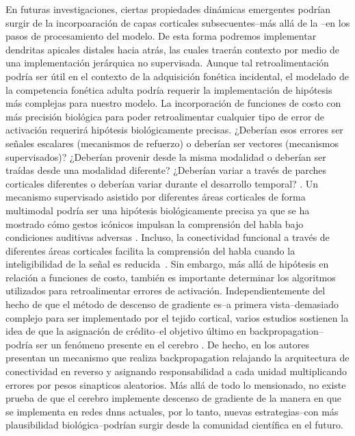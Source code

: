 En futuras investigaciones, ciertas propiedades dinámicas emergentes podrían surgir de la incorpoaración de capas corticales subsecuentes--más allá de la --en los pasos de procesamiento del modelo. De esta forma podremos implementar dendritas apicales distales hacia atrás, las cuales traerán contexto por medio de una implementación jerárquica no supervisada.
Aunque tal retroalimentación podría ser útil en el contexto de la adquisición fonética incidental, el modelado de la competencia fonética adulta podría requerir la implementación de hipótesis más complejas para nuestro modelo. La incorporación de funciones de costo con más precisión biológica para poder retroalimentar cualquier tipo de error de activación requerirá hipótesis biológicamente precisas. ¿Deberían esos errores ser señales escalares (mecanismos de refuerzo) o deberían ser vectores (mecanismos supervisados)? ¿Deberían provenir desde la misma modalidad o deberían ser traídas desde una modalidad diferente? ¿Deberían variar a través de parches corticales diferentes o deberían variar durante el desarrollo temporal? \cite{10.3389/fncom.2016.00094}.
Un mecanismo supervisado asistido por diferentes áreas corticales de forma multimodal podría ser una hipótesis biológicamente precisa ya que se ha mostrado cómo gestos icónicos impulsan la comprensión del habla bajo condiciones auditivas adversas \cite{HOLLE2010875}.
Incluso, la conectividad funcional a través de diferentes áreas corticales facilita la comprensión del habla cuando la inteligibilidad de la señal es reducida~\cite{Obleser2283}. Sin embargo, más allá de hipótesis en relación a funciones de costo, también es importante determinar los algoritmos utilizados para retroalimentar errores de activación. Independientemente del hecho de que el método de descenso de gradiente es--a primera vista--demasiado complejo para ser implementado por el tejido cortical, varios estudios sostienen la idea de que la asignación de crédito--el objetivo último en backpropagation--podría ser un fenómeno presente en el cerebro \cite{Guerguiev2017TowardsDL}. De hecho, en \cite{Lillicrap_2016} los autores presentan un mecanismo que realiza backpropagation relajando la arquitectura de conectividad en reverso y asignando responsabilidad a cada unidad multiplicando errores por pesos sinapticos aleatorios.
Más allá de todo lo mensionado, no existe prueba de que el cerebro implemente descenso de gradiente de la manera en que se implementa en redes \glspl{dnn} actuales, por lo tanto, nuevas estrategias--con más plausibilidad biológica--podrían surgir desde la comunidad científica en el futuro.

